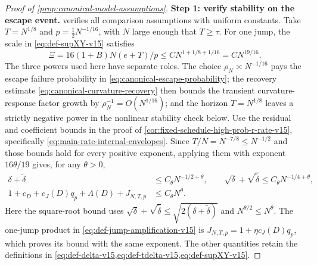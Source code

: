 \begin{proof}[Proof of \cref{prop:canonical-model-assumptions}]
\noindent\textbf{Step 1: verify stability on the escape event.}
 verifies all comparison
assumptions with uniform constants.
Take $T=N^{1/8}$ and $p=\tfrac12N^{-1/16}$, with $N$ large enough that
$T\ge\tau$. For one jump, the scale in \eqref{eq:def-supXY-v15} satisfies
\[
 \Xi=16(1+B)N(e+T)/p\le CN^{1+1/8+1/16}=CN^{19/16}.
\]
The three powers used here have separate roles. The choice
$\rho_N\asymp N^{-1/16}$ pays the escape failure probability in
\cref{eq:canonical-escape-probability}; the recovery estimate
\cref{eq:canonical-curvature-recovery} then bounds the transient curvature-response factor
growth by $\rho_N^{-1}=O(N^{1/16})$; and the horizon $T=N^{1/8}$ leaves a
strictly negative power in the nonlinear stability check below.
Use the residual and coefficient bounds in the proof of
\cref{cor:fixed-schedule-high-prob-r-rate-v15}, specifically
\eqref{eq:main-rate-internal-envelopes}.
Since $T/N=N^{-7/8}\le N^{-1/2}$ and those bounds hold for every
positive exponent, applying them with exponent $16\theta/19$ gives,
for any $\theta>0$,
\begin{equation}
 \begin{split}
 \delta+\widetilde\delta&\le C_\theta N^{-1/2+\theta},\qquad
 \sqrt\delta+\sqrt{\widetilde\delta}\le C_\theta N^{-1/4+\theta},\\
 1+c_D+c_J(D)q_p+\Lambda(D)+J_{N,T,p}&\le C_\theta N^\theta.
 \end{split}
 \label{eq:canonical-residual-envelopes}
\end{equation}
Here the square-root bound uses
$\sqrt\delta+\sqrt{\widetilde\delta}\le\sqrt{2(\delta+\widetilde\delta)}$
and $N^{\theta/2}\le N^\theta$.
The one-jump product in \eqref{eq:def-jump-amplification-v15} is
$J_{N,T,p}=1+\eta c_J(D)q_p$, which proves its bound with the same exponent.
The other quantities retain the definitions in
\cref{eq:def-delta-v15,eq:def-tdelta-v15,eq:def-supXY-v15}.


\end{proof}
